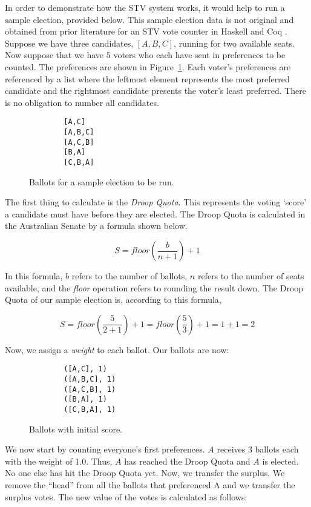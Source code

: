 In order to demonstrate how the STV system works, it would help to run a sample
election, provided below. This sample election data is not original and obtained
from prior literature for an STV vote counter in Haskell and Coq
\cite{stv_haskell}. Suppose we have three candidates, $[A, B, C]$, running for
two available seats. Now suppose that we have 5 voters who each have sent in
preferences to be counted. The preferences are shown in
Figure~\ref{sample_election}. Each voter's preferences are referenced by a list
where the leftmost element represents the most preferred candidate and the
rightmost candidate presents the voter's least preferred. There is no obligation
to number all candidates. 


\begin{figure}[ht!!!!!!!!]
    \caption{Ballots for a sample election to be run. }
    \label{sample_election}
    \begin{lstlisting}
        [A,C]
        [A,B,C]
        [A,C,B]
        [B,A]
        [C,B,A]
    \end{lstlisting}
\end{figure}

The first thing to calculate is the \textit{Droop Quota}. This represents the
voting `score' a candidate must have before they are elected. The Droop Quota is
calculated in the Australian Senate by a formula shown below. 

$$
S = floor(\frac{b}{n + 1}) + 1
$$

In this formula, $b$ refers to the number of ballots, $n$ refers to the number
of seats available, and the \textit{floor} operation refers to rounding the
result down. The Droop Quota of our sample election is, according to this formula, 

$$
S = floor(\frac{5}{2 + 1}) + 1 = floor(\frac{5}{3}) + 1 = 1 + 1 = 2
$$

Now, we assign a \textit{weight} to each ballot. Our ballots are now: 

\begin{figure}[ht!!!!!!!!]
    \caption{Ballots with initial score.}
    \label{sample_election2}
    \begin{lstlisting}
        ([A,C], 1)
        ([A,B,C], 1)
        ([A,C,B], 1)
        ([B,A], 1)
        ([C,B,A], 1)
    \end{lstlisting}
\end{figure}

We now start by counting everyone's first preferences. $A$ receives 3 ballots
each with the weight of 1.0. Thus, $A$ has reached the Droop Quota and $A$ is
elected. No one else has hit the Droop Quota yet. Now, we transfer the surplus.
We remove the ``head'' from all the ballots that preferenced A and we transfer
the surplus votes. The new value of the votes is calculated as follows: 

